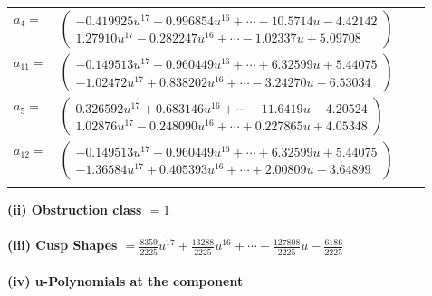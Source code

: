 \documentclass[1p]{elsarticle_modified}
\theoremstyle{definition}
\begin{document}
\begin{tabular}{m{7pt} m{180pt} m{7pt} m{180pt} }
\flushright $a_{4}=$&$\begin{pmatrix}-0.419925 u^{17}+0.996854 u^{16}+\cdots-10.5714 u-4.42142\\1.27910 u^{17}-0.282247 u^{16}+\cdots-1.02337 u+5.09708\end{pmatrix}$ \\
\flushright $a_{11}=$&$\begin{pmatrix}-0.149513 u^{17}-0.960449 u^{16}+\cdots+6.32599 u+5.44075\\-1.02472 u^{17}+0.838202 u^{16}+\cdots-3.24270 u-6.53034\end{pmatrix}$ \\
\flushright $a_{5}=$&$\begin{pmatrix}0.326592 u^{17}+0.683146 u^{16}+\cdots-11.6419 u-4.20524\\1.02876 u^{17}-0.248090 u^{16}+\cdots+0.227865 u+4.05348\end{pmatrix}$ \\
\flushright $a_{12}=$&$\begin{pmatrix}-0.149513 u^{17}-0.960449 u^{16}+\cdots+6.32599 u+5.44075\\-1.36584 u^{17}+0.405393 u^{16}+\cdots+2.00809 u-3.64899\end{pmatrix}$\\&\end{tabular}
\flushleft \textbf{(ii) Obstruction class $= 1$}\\~\\
\flushleft \textbf{(iii) Cusp Shapes $= \frac{8359}{2225} u^{17}+\frac{13288}{2225} u^{16}+\cdots-\frac{127808}{2225} u-\frac{6186}{2225}$}\\~\\
\newpage\renewcommand{\arraystretch}{1}
\flushleft \textbf{(iv) u-Polynomials at the component}\newline \\
\end{document}
